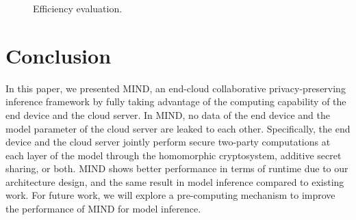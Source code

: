 \documentclass[conference]{IEEEtran}
\begin{document}
\begin{figure}[ht]
     \hspace{2pt}
    \caption{Efficiency evaluation.}
    \label{fig:efficiency}
\end{figure}

\section{Conclusion}
In this paper, we presented MIND, an end-cloud collaborative privacy-preserving inference framework by fully taking advantage of the computing capability of the end device and the cloud server. In MIND, no data of the end device and the model parameter of the cloud server are leaked to each other. Specifically, the end device and the cloud server jointly perform secure two-party computations at each layer of the model through the homomorphic cryptosystem, additive secret sharing, or both. MIND shows better performance in terms of runtime due to our architecture design, and the same result in model inference compared to existing work.
For future work, we will explore a pre-computing mechanism to improve the performance of MIND for model inference.


\end{document}
